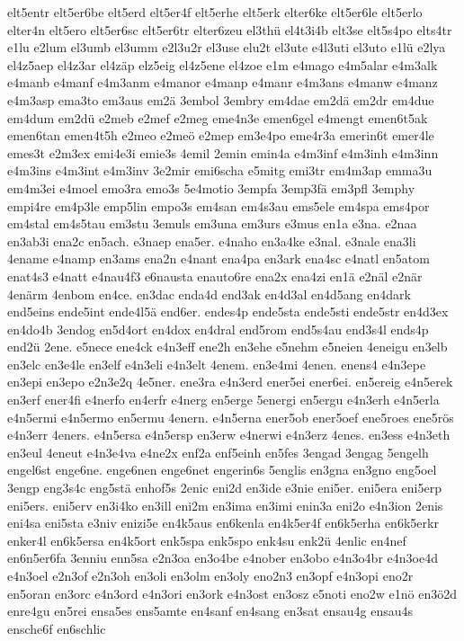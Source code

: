 {elt5entr
elt5er6be
elt5erd
elt5er4f
elt5erhe
elt5erk
elter6ke
elt5er6le
elt5erlo
elter4n
elt5ero
elt5er6sc
elt5er6tr
elter6zeu
el3thü
el4t3i4b
elt3se
elt5s4po
elts4tr
e1lu
e2lum
el3umb
el3umm
e2l3u2r
el3use
elu2t
el3ute
e4l3uti
el3uto
e1lü
e2lya
el4z5aep
el4z3ar
el4zäp
elz5eig
el4z5ene
el4zoe
e1m
e4mago
e4m5alar
e4m3alk
e4manb
e4manf
e4m3anm
e4manor
e4manp
e4manr
e4m3ans
e4manw
e4manz
e4m3asp
ema3to
em3aus
em2ä
3embol
3embry
em4dae
em2dä
em2dr
em4due
em4dum
em2dü
e2meb
e2mef
e2meg
eme4n3e
emen6gel
e4mengt
emen6t5ak
emen6tan
emen4t5h
e2meo
e2meö
e2mep
em3e4po
eme4r3a
emerin6t
emer4le
emes3t
e2m3ex
emi4e3i
emie3s
4emil
2emin
emin4a
e4m3inf
e4m3inh
e4m3inn
e4m3ins
e4m3int
e4m3inv
3e2mir
emi6scha
e5mitg
emi3tr
em4m3ap
emma3u
em4m3ei
e4moel
emo3ra
emo3s
5e4motio
3empfa
3emp3fä
em3pfl
3emphy
empi4re
em4p3le
emp5lin
empo3s
em4san
em4s3au
ems5ele
em4spa
ems4por
em4stal
em4s5tau
em3stu
3emuls
em3una
em3urs
e3mus
en1a
e3na.
e2naa
en3ab3i
ena2c
en5ach.
e3naep
ena5er.
e4naho
en3a4ke
e3nal.
e3nale
ena3li
4ename
e4namp
en3ams
ena2n
e4nant
ena4pa
en3ark
ena4sc
e4natl
en5atom
enat4s3
e4natt
e4nau4f3
e6nausta
enauto6re
ena2x
ena4zi
en1ä
e2näl
e2när
4enärm
4enbom
en4ce.
en3dac
enda4d
end3ak
en4d3al
en4d5ang
en4dark
end5eins
ende5int
ende4l5ä
end6er.
endes4p
ende5sta
ende5sti
ende5str
en4d3ex
en4do4b
3endog
en5d4ort
en4dox
en4dral
end5rom
end5s4au
end3s4l
ends4p
end2ü
2ene.
e5nece
ene4ck
e4n3eff
ene2h
en3ehe
e5nehm
e5neien
4eneigu
en3elb
en3elc
en3e4le
en3elf
e4n3eli
e4n3elt
4enem.
en3e4mi
4enen.
enens4
e4n3epe
en3epi
en3epo
e2n3e2q
4e5ner.
ene3ra
e4n3erd
ener5ei
ener6ei.
en5ereig
e4n5erek
en3erf
ener4fi
e4nerfo
en4erfr
e4nerg
en5erge
5energi
en5ergu
e4n3erh
e4n5erla
e4n5ermi
e4n5ermo
en5ermu
4enern.
e4n5erna
ener5ob
ener5oef
ene5roes
ene5rös
e4n3err
4eners.
e4n5ersa
e4n5ersp
en3erw
e4nerwi
e4n3erz
4enes.
en3ess
e4n3eth
en3eul
4eneut
e4n3e4va
e4ne2x
enf2a
enf5einh
en5fes
3engad
3engag
5engelh
engel6st
enge6ne.
enge6nen
enge6net
engerin6s
5englis
en3gna
en3gno
eng5oel
3engp
eng3s4c
eng5stä
enhof5s
2enic
eni2d
en3ide
e3nie
eni5er.
eni5era
eni5erp
eni5ers.
eni5erv
en3i4ko
en3ill
eni2m
en3ima
en3imi
enin3a
eni2o
e4n3ion
2enis
eni4sa
eni5sta
e3niv
enizi5e
en4k5aus
en6kenla
en4k5er4f
en6k5erha
en6k5erkr
enker4l
en6k5ersa
en4k5ort
enk5spa
enk5spo
enk4su
enk2ü
4enlic
en4nef
en6n5er6fa
3enniu
enn5sa
e2n3oa
en3o4be
e4nober
en3obo
e4n3o4br
e4n3oe4d
e4n3oel
e2n3of
e2n3oh
en3oli
en3olm
en3oly
eno2n3
en3opf
e4n3opi
eno2r
en5oran
en3orc
e4n3ord
e4n3ori
en3ork
e4n3ost
en3osz
e5noti
eno2w
e1nö
en3ö2d
enre4gu
en5rei
ensa5es
ens5amte
en4sanf
en4sang
en3sat
ensau4g
ensau4s
ensche6f
en6schlic
}
